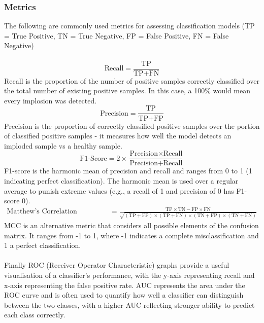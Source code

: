 \documentclass[a4paper]{report}
\begin{document}
\subsubsection{Metrics}
The following are commonly used metrics for assessing classification models (TP = True Positive, TN = True Negative, FP = False Positive, FN = False Negative)\\\\
\[ \text{Recall} = \frac{\text{TP}}{\text{TP} + \text{FN}} \]
Recall is the proportion of the number of positive samples correctly classified over the total number of existing positive samples. In this case, a 100\% would mean every implosion was detected.
\[ \text{Precision} = \frac{\text{TP}}{\text{TP} + \text{FP}} \]
Precision is the proportion of correctly classified positive samples over the portion of classified positive samples - it measures how well the model detects an imploded sample vs a healthy sample.
\[ \text{F1-Score} = 2 \times \frac{\text{Precision} \times \text{Recall}}{\text{Precision} + \text{Recall}} \]
F1-score is the harmonic mean of precision and recall and ranges from 0 to 1 (1 indicating perfect classification). The harmonic mean is used over a regular average to punish extreme values (e.g., a recall of 1 and
precision of 0 has F1-score 0).
\begin{align*}
  \text{Matthew's Correlation Coefficient} &= \frac{\text{TP} \times \text{TN} - \text{FP} \times \text{FN}}{\sqrt{(\text{TP} + \text{FP}) \times (\text{TP} + \text{FN}) \times (\text{TN} + \text{FP}) \times (\text{TN} + \text{FN})  }}
\end{align*}
MCC is an alternative metric that considers all possible elements of the confusion matrix. It ranges from -1 to 1, where -1 indicates a complete misclassification and 1 a perfect classification.\\\\Finally ROC (Receiver Operator Characteristic) graphs 
provide a useful visualisation of a classifier's performance, with the y-axis representing recall and x-axis representing the false positive rate. AUC represents the area under the ROC curve and is often used to quantify how well a classifier can distinguish between the 
two classes, with a higher AUC reflecting stronger ability to predict each class correctly. 
\end{document}
